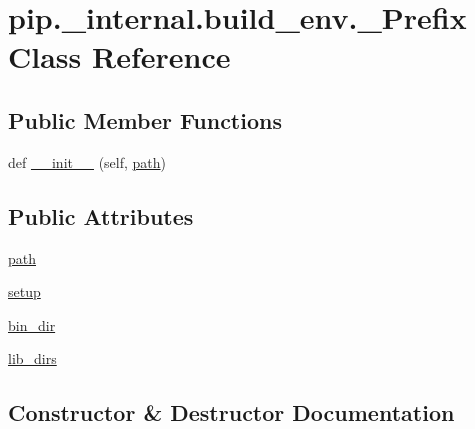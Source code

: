 \hypertarget{classpip_1_1__internal_1_1build__env_1_1__Prefix}{}\section{pip.\+\_\+internal.\+build\+\_\+env.\+\_\+\+Prefix Class Reference}
\label{classpip_1_1__internal_1_1build__env_1_1__Prefix}
\subsection*{Public Member Functions}
\begin{DoxyCompactItemize}
\item 
def \hyperlink{classpip_1_1__internal_1_1build__env_1_1__Prefix_aeac0a2744da2c07d2640671996ca96d2}{\+\_\+\+\_\+init\+\_\+\+\_\+} (self, \hyperlink{classpip_1_1__internal_1_1build__env_1_1__Prefix_a28bd2b5d1c336d1652349142a48a5a78}{path})
\end{DoxyCompactItemize}
\subsection*{Public Attributes}
\begin{DoxyCompactItemize}
\item 
\hyperlink{classpip_1_1__internal_1_1build__env_1_1__Prefix_a28bd2b5d1c336d1652349142a48a5a78}{path}
\item 
\hyperlink{classpip_1_1__internal_1_1build__env_1_1__Prefix_a8c3f4312adc6d324a36d6dfb1227663f}{setup}
\item 
\hyperlink{classpip_1_1__internal_1_1build__env_1_1__Prefix_a020d3776c336071fb8a8daf5781750a8}{bin\+\_\+dir}
\item 
\hyperlink{classpip_1_1__internal_1_1build__env_1_1__Prefix_aab12e45aa6ad2a83013d872fe0cb221c}{lib\+\_\+dirs}
\end{DoxyCompactItemize}


\subsection{Constructor \& Destructor Documentation}
\mbox{\label{classpip_1_1__internal_1_1build__env_1_1__Prefix_aeac0a2744da2c07d2640671996ca96d2}} 
